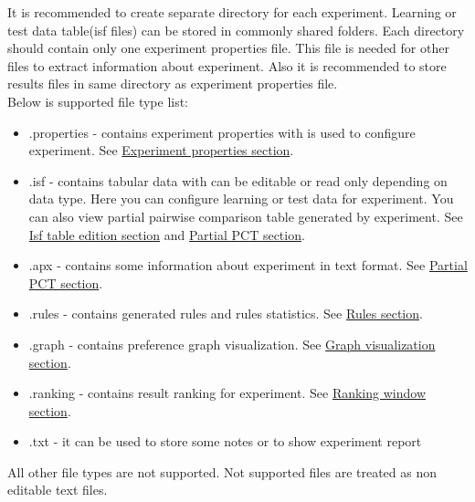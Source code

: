 It is recommended to create separate directory for each experiment. Learning or test data table(isf files) can be stored in commonly shared folders. Each directory should contain only one experiment properties file. This file is needed for other files to extract information about experiment. Also it is recommended to store results files in same directory as experiment properties file.\\

Below is supported file type list:
\begin{itemize}
	\item .properties - contains experiment properties with is used to configure experiment. See \hyperref[section:properties]{Experiment properties section}.
	\item .isf - contains tabular data with can be editable or read only depending on data type. Here you can configure learning or test data for experiment. You can also view partial pairwise comparison table generated by experiment.
	See \hyperref[section:isf-table]{Isf table edition section} and  \hyperref[sub:pct-isf]{Partial PCT section}.
	\item .apx - contains some information about experiment in text format.
	See \hyperref[sub:pct-apx]{Partial PCT section}.
	\item .rules - contains generated rules and rules statistics.
	See \hyperref[section:rules]{Rules section}.
	\item .graph - contains preference graph visualization.
	See \hyperref[section:graph]{Graph visualization section}.
	\item .ranking - contains result ranking for experiment.
	See \hyperref[section:ranking]{Ranking window section}.
	\item .txt - it can be used to store some notes or to show experiment report
\end{itemize}

All other file types are not supported. Not supported files are treated as non editable text files.

\vfill\newpage